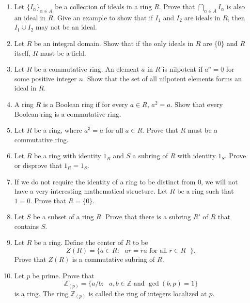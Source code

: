 {\begin{enumerate}
 
\item
Let $\{ I_{\alpha} \}_{\alpha \in A}$ be a collection of ideals in a
ring $R$.  Prove that $\bigcap_{\alpha \in A} I_{\alpha}$ is also an
ideal in $R$. Give an example to show that if $I_1$ and $I_2$ are
ideals in $R$, then $I_1 \cup I_2$ may not be an ideal. 
 
 
\item
Let $R$ be an integral domain.  Show that if the only ideals in $R$ 
are $\{ 0 \}$ and $R$ itself, $R$ must be a field. 
 
 
\item
Let $R$ be a commutative ring.  An element $a$ in $R$ is {\bfi
nilpotent\/} if $a^n =
0$ for some positive integer $n$. Show that the set of all nilpotent
elements forms an ideal in $R$.   
 
 
\item
A ring $R$ is a {\bfi Boolean
ring\/} if for every $a \in R$,
$a^2 = a$. Show that every Boolean ring is a commutative ring.
 
 
\item
Let $R$ be a ring, where $a^3 =a$ for all $a \in R$. Prove that $R$
must be a commutative ring. 
 
 
\item
Let $R$ be a ring with identity $1_R$ and $S$ a subring of $R$ with
identity $1_S$.  Prove or disprove that $1_R = 1_S$.
 
 
 
\item
If we do not require the identity of a ring to be distinct from 0, we
will not have a very interesting mathematical structure. Let $R$ be a
ring such that $1 = 0$. Prove that $R = \{ 0 \}$. 
 
 
\item
Let $S$ be a subset of a ring $R$.  Prove that there is a subring $R'$
of $R$ that contains $S$. 
 
 
\item
Let $R$ be a ring. Define the {\bfi center\/} of $R$ to be 
\[
Z(R) = \{ a \in R : \mbox{ $ar = ra$ for all $r \in R$ } \}.
\]
Prove that $Z(R)$ is a commutative subring of $R$.
 
 
\item
Let $p$ be prime. Prove that
\[
{\mathbb Z}_{(p)}\label{notelocalint} = \{ a / b :  \mbox{ $a, b \in
{\mathbb Z}$ and $\gcd( b,p) =  1$}  \}  
\]
is a ring.  The ring ${\mathbb Z}_{(p)}$ is called the {\bfi ring of
integers localized at $p$}.  
 

\end{enumerate}}
